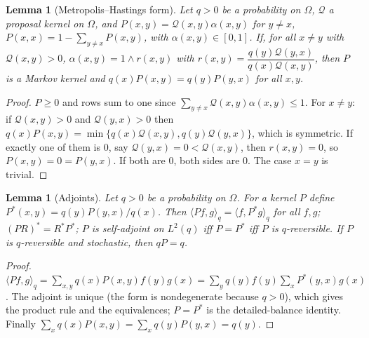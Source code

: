 \documentclass[11pt]{article}
\newtheorem{lemma}[theorem]{Lemma}
\theoremstyle{remark}
\newcommand{\Om}{\Omega}
\begin{document}
\begin{lemma}[Metropolis--Hastings form]\label{lem:mh}
Let $q>0$ be a probability on $\Om$, $\mathcal Q$ a proposal kernel on $\Om$, and $P(x,y)=\mathcal Q(x,y)\alpha(x,y)$ for $y\ne x$, $P(x,x)=1-\sum_{y\ne x}P(x,y)$, with $\alpha(x,y)\in[0,1]$. If, for all $x\neq y$ with $\mathcal Q(x,y)>0$,
$\alpha(x,y)=1\wedge r(x,y)$ with $r(x,y)=\dfrac{q(y)\mathcal Q(y,x)}{q(x)\mathcal Q(x,y)}$, then $P$ is a Markov kernel and $q(x)P(x,y)=q(y)P(y,x)$ for all $x,y$.
\end{lemma}
\begin{proof}
$P\ge0$ and rows sum to one since $\sum_{y\ne x}\mathcal Q(x,y)\alpha(x,y)\le1$. For $x\ne y$: if $\mathcal Q(x,y)>0$ and $\mathcal Q(y,x)>0$ then $q(x)P(x,y)=\min\{q(x)\mathcal Q(x,y),q(y)\mathcal Q(y,x)\}$, which is symmetric. If exactly one of them is $0$, say $\mathcal Q(y,x)=0<\mathcal Q(x,y)$, then $r(x,y)=0$, so $P(x,y)=0=P(y,x)$. If both are $0$, both sides are $0$. The case $x=y$ is trivial.
\end{proof}

\begin{lemma}[Adjoints]\label{lem:adj}
Let $q>0$ be a probability on $\Om$. For a kernel $P$ define $P^*(x,y)=q(y)P(y,x)/q(x)$. Then $\langle Pf,g\rangle_{q}=\langle f,P^*g\rangle_q$ for all $f,g$; $(PR)^*=R^*P^*$; $P$ is self-adjoint on $L^2(q)$ iff $P=P^*$ iff $P$ is $q$-reversible. If $P$ is $q$-reversible and stochastic, then $qP=q$.
\end{lemma}
\begin{proof}
$\langle Pf,g\rangle_q=\sum_{x,y}q(x)P(x,y)f(y)g(x)=\sum_{y}q(y)f(y)\sum_x P^*(y,x)g(x)$. The adjoint is unique (the form is nondegenerate because $q>0$), which gives the product rule and the equivalences; $P=P^*$ is the detailed-balance identity. Finally $\sum_xq(x)P(x,y)=\sum_x q(y)P(y,x)=q(y)$.
\end{proof}
\end{document}
